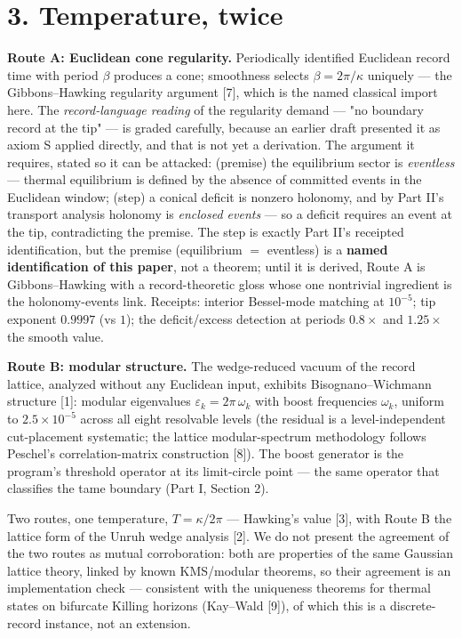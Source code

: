 \documentclass[11pt]{article}
\begin{document}
\section*{3. Temperature, twice}
\textbf{Route A: Euclidean cone regularity.}  Periodically identified Euclidean record time with period $\beta$ produces a cone; smoothness selects $\beta = 2\pi/\kappa$ uniquely — the Gibbons–Hawking regularity argument [7], which is the named classical import here.  The \emph{record-language reading} of the regularity demand — "no boundary record at the tip" — is graded carefully, because an earlier draft presented it as axiom S applied directly, and that is not yet a derivation.  The argument it requires, stated so it can be attacked: (premise) the equilibrium sector is \emph{eventless} — thermal equilibrium is defined by the absence of committed events in the Euclidean window; (step) a conical deficit is nonzero holonomy, and by Part II's transport analysis holonomy is \emph{enclosed events} — so a deficit requires an event at the tip, contradicting the premise.  The step is exactly Part II's receipted identification, but the premise (equilibrium $=$ eventless) is a \textbf{named identification of this paper}, not a theorem; until it is derived, Route A is Gibbons–Hawking with a record-theoretic gloss whose one nontrivial ingredient is the holonomy-events link.  Receipts: interior Bessel-mode matching at $10^{-5}$; tip exponent $0.9997$ (vs $1$); the deficit/excess detection at periods $0.8\times$ and $1.25\times$ the smooth value.

\textbf{Route B: modular structure.}  The wedge-reduced vacuum of the record lattice, analyzed without any Euclidean input, exhibits Bisognano–Wichmann structure [1]: modular eigenvalues $\varepsilon_k = 2\pi\,\omega_k$ with boost frequencies $\omega_k$, uniform to $2.5\times 10^{-5}$ across all eight resolvable levels (the residual is a level-independent cut-placement systematic; the lattice modular-spectrum methodology follows Peschel's correlation-matrix construction [8]).  The boost generator is the program's threshold operator at its limit-circle point — the same operator that classifies the tame boundary (Part I, Section 2).

Two routes, one temperature, $T = \kappa/2\pi$ — Hawking's value [3], with Route B the lattice form of the Unruh wedge analysis [2].  We do not present the agreement of the two routes as mutual corroboration: both are properties of the same Gaussian lattice theory, linked by known KMS/modular theorems, so their agreement is an implementation check — consistent with the uniqueness theorems for thermal states on bifurcate Killing horizons (Kay–Wald [9]), of which this is a discrete-record instance, not an extension.
\end{document}
